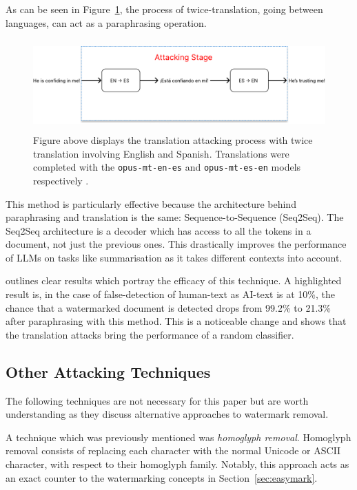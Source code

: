 \documentclass{l4proj}
\theoremstyle{definition}
\begin{document}
        As can be seen in Figure~\ref{fig:translation-removal-process}, the process of twice-translation, going between languages, can act as a paraphrasing operation.

        \begin{figure}[ht]
            \centering
            \includegraphics[height=3.5cm, width=1\linewidth, keepaspectratio]{images/background/translation-removal-process.pdf}
            \caption{Figure above displays the translation attacking process with twice translation involving English and Spanish. Translations were completed with the \texttt{opus-mt-en-es} and \texttt{opus-mt-es-en} models respectively \citep{TiedemannThottingal:EAMT2020}.}
            \label{fig:translation-removal-process}
        \end{figure}
        
        This method is particularly effective because the architecture behind paraphrasing and translation is the same: Sequence-to-Sequence (Seq2Seq). The Seq2Seq architecture is a decoder which has access to all the tokens in a document, not just the previous ones. This drastically improves the performance of LLMs on tasks like summarisation as it takes different contexts into account. 

        \citet{he2024watermarks} outlines clear results which portray the efficacy of this technique. A highlighted result is, in the case of false-detection of human-text as AI-text is at 10\%, the chance that a watermarked document is detected drops from 99.2\% to 21.3\% after paraphrasing with this method. This is a noticeable change and shows that the translation attacks bring the performance of a random classifier. 

    \subsection{Other Attacking Techniques}
        The following techniques are not necessary for this paper but are worth understanding as they discuss alternative approaches to watermark removal.
    
        A technique which was previously mentioned was \emph{homoglyph removal}. Homoglyph removal consists of replacing each character with the normal Unicode or ASCII character, with respect to their homoglyph family. Notably, this approach acts as an exact counter to the watermarking concepts in Section~\ref{sec:easymark}. 
\end{document}
